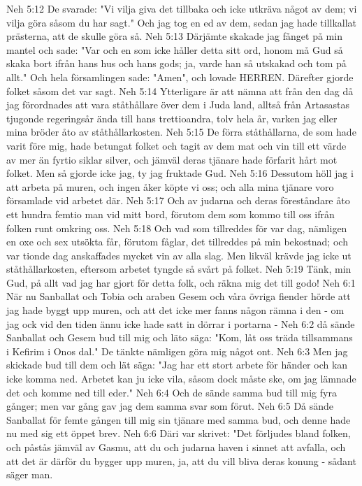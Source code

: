 Neh 5:12  De svarade: "Vi vilja giva det tillbaka och icke utkräva något av dem; vi vilja göra såsom du har sagt." Och jag tog en ed av dem, sedan jag hade tillkallat prästerna, att de skulle göra så.
Neh 5:13  Därjämte skakade jag fånget på min mantel och sade: "Var och en som icke håller detta sitt ord, honom må Gud så skaka bort ifrån hans hus och hans gods; ja, varde han så utskakad och tom på allt." Och hela församlingen sade: "Amen", och lovade HERREN. Därefter gjorde folket såsom det var sagt.
Neh 5:14  Ytterligare är att nämna att från den dag då jag förordnades att vara ståthållare över dem i Juda land, alltså från Artasastas tjugonde regeringsår ända till hans trettioandra, tolv hela år, varken jag eller mina bröder åto av ståthållarkosten.
Neh 5:15  De förra ståthållarna, de som hade varit före mig, hade betungat folket och tagit av dem mat och vin till ett värde av mer än fyrtio siklar silver, och jämväl deras tjänare hade förfarit hårt mot folket. Men så gjorde icke jag, ty jag fruktade Gud.
Neh 5:16  Dessutom höll jag i att arbeta på muren, och ingen åker köpte vi oss; och alla mina tjänare voro församlade vid arbetet där.
Neh 5:17  Och av judarna och deras föreståndare åto ett hundra femtio man vid mitt bord, förutom dem som kommo till oss ifrån folken runt omkring oss.
Neh 5:18  Och vad som tillreddes för var dag, nämligen en oxe och sex utsökta får, förutom fåglar, det tillreddes på min bekostnad; och var tionde dag anskaffades mycket vin av alla slag. Men likväl krävde jag icke ut ståthållarkosten, eftersom arbetet tyngde så svårt på folket.
Neh 5:19  Tänk, min Gud, på allt vad jag har gjort för detta folk, och räkna mig det till godo!
Neh 6:1  När nu Sanballat och Tobia och araben Gesem och våra övriga fiender hörde att jag hade byggt upp muren, och att det icke mer fanns någon rämna i den - om jag ock vid den tiden ännu icke hade satt in dörrar i portarna -
Neh 6:2  då sände Sanballat och Gesem bud till mig och läto säga: "Kom, låt oss träda tillsammans i Kefirim i Onos dal." De tänkte nämligen göra mig något ont.
Neh 6:3  Men jag skickade bud till dem och lät säga: "Jag har ett stort arbete för händer och kan icke komma ned. Arbetet kan ju icke vila, såsom dock måste ske, om jag lämnade det och komme ned till eder."
Neh 6:4  Och de sände samma bud till mig fyra gånger; men var gång gav jag dem samma svar som förut.
Neh 6:5  Då sände Sanballat för femte gången till mig sin tjänare med samma bud, och denne hade nu med sig ett öppet brev.
Neh 6:6  Däri var skrivet: "Det förljudes bland folken, och påstås jämväl av Gasmu, att du och judarna haven i sinnet att avfalla, och att det är därför du bygger upp muren, ja, att du vill bliva deras konung - sådant säger man.
